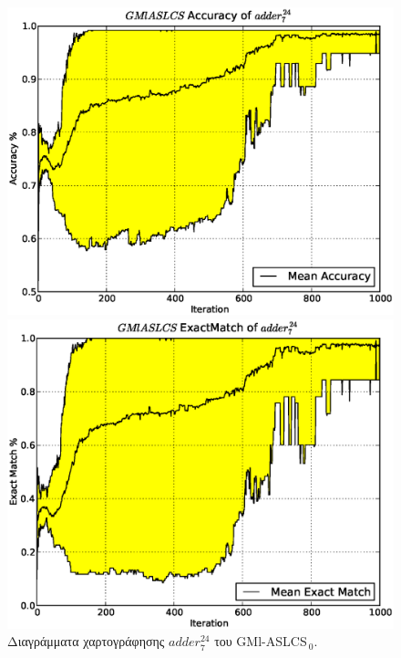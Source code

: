 \begin{figure}[ht]
  \caption{Διαγράμματα χαρτογράφησης $adder_{7}^{24}$ του GMl-ASLCS$_{\:0}$.}
  \label{fig:gmlaslcs0adder7_24}
  \begin{minipage}[b]{0.5\linewidth}
    \centering
    \includegraphics[scale=.42]{./images/artificial/gmlaslcs0/base/adder7_24GMlASLCSacc.eps}
  \end{minipage}
  \begin{minipage}[b]{0.5\linewidth}
    \centering
    \includegraphics[scale=.42]{./images/artificial/gmlaslcs0/base/adder7_24GMlASLCSex.eps}
  \end{minipage}
\end{figure}

